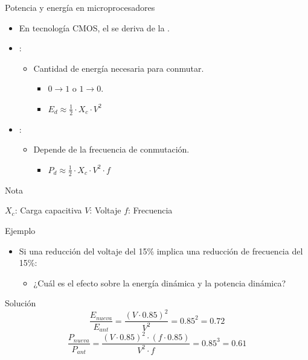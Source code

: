\begin{frame}[t]{Potencia y energía en microprocesadores}
\begin{itemize}
  \item En tecnología CMOS, el  se deriva de la
        .

  \item {}:
    \begin{itemize}
      \item Cantidad de energía necesaria para conmutar.
        \begin{itemize}
          \item $0 \rightarrow 1$ o $1 \rightarrow 0$.
          \item $E_d \approx \frac{1}{2} \cdot X_c \cdot V^2$
        \end{itemize}
    \end{itemize}

  \item {}:
    \begin{itemize}
      \item Depende de la frecuencia de conmutación.
        \begin{itemize}
          \item $P_d \approx \frac{1}{2} \cdot X_c \cdot V^2 \cdot f$
        \end{itemize}
    \end{itemize}
\end{itemize}
\begin{block}{Nota}
\begin{small}
  $X_c$: Carga capacitiva\qquad
  $V$: Voltaje \qquad
  $f$: Frecuencia
\end{small}
\end{block}
\end{frame}

\begin{frame}[t]{Ejemplo}
\begin{itemize}
  \item Si una reducción del voltaje del 15\% implica una reducción de frecuencia del 15\%:
    \begin{itemize}
      \item ¿Cuál es el efecto sobre la energía dinámica y la potencia dinámica?
    \end{itemize}
\end{itemize}

\begin{block}{Solución}
\begin{displaymath}
\frac{E_{nueva}}{E_{ant}} =
\frac
{(V \cdot 0.85)^2}
{V^2} =
0.85^2 =
0.72
\end{displaymath}
\pause
\begin{displaymath}
\frac{P_{nueva}}{P_{ant}} =
\frac
{(V \cdot 0.85)^2 \cdot (f \cdot 0.85)}
{V^2 \cdot f} =
0.85^3 =
0.61
\end{displaymath}
\end{block}
\end{frame}

